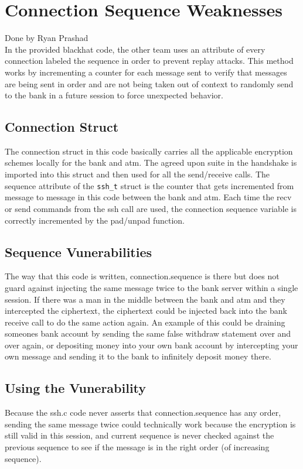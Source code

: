 \section{Connection Sequence Weaknesses}\label{sec:conseq}
Done by Ryan Prashad\\

	\medskip
	In the provided blackhat code, the other team uses an attribute of every connection labeled the sequence in order to prevent replay attacks. This method works by incrementing a counter for each message sent to verify that messages are being sent in order and are not being taken out of context to randomly send to the bank in a future session to force unexpected behavior.
	
	\subsection{Connection Struct}\label{sec:connstruct}
		The connection struct in this code basically carries all the applicable encryption schemes locally for the bank and atm. The agreed upon suite in the handshake is imported into this struct and then used for all the send/receive calls. The sequence attribute of the \texttt{ssh\_t} struct is the counter that gets incremented from message to message in this code between the bank and atm. Each time the recv or send commands from the ssh call are used, the connection sequence variable is correctly incremented by the pad/unpad function.
	
	\subsection{Sequence Vunerabilities}\label{sec:seqvun}
		The way that this code is written, connection.sequence is there but does not guard against injecting the same message twice to the bank server within a single session. If there was a man in the middle between the bank and atm and they intercepted the ciphertext, the ciphertext could be injected back into the bank receive call to do the same action again. An example of this could be draining someones bank account by sending the same false withdraw statement over and over again, or depositing money into your own bank account by intercepting your own message and sending it to the bank to infinitely deposit money there.
	
	\subsection{Using the Vunerability}\label{sec:usevun}
		Because the ssh.c code never asserts that connection.sequence has any order, sending the same message twice could technically work because the encryption is still valid in this session, and current sequence is never checked against the previous sequence to see if the message is in the right order (of increasing sequence).
	

